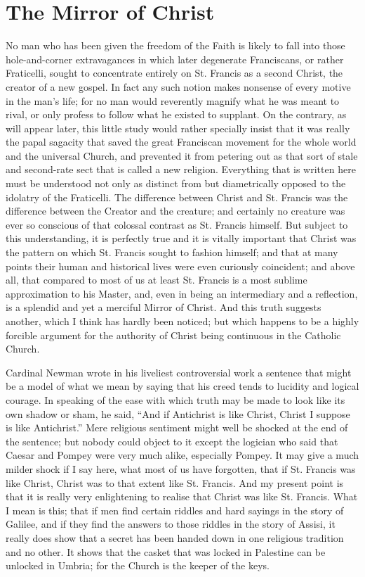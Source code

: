 \documentclass{book}
\begin{document}
\chapter{The Mirror of Christ}
\label{chapter-7}
No man who has been given the freedom of the Faith is likely to fall into those hole-and-corner extravagances in which later degenerate Franciscans, or rather Fraticelli, sought to concentrate entirely on St. Francis as a second Christ, the creator of a new gospel. In fact any such notion makes nonsense of every motive in the man’s life; for no man would reverently magnify what he was meant to rival, or only profess to follow what he existed to supplant. On the contrary, as will appear later, this little study would rather specially insist that it was really the papal sagacity that saved the great Franciscan movement for the whole world and the universal Church, and prevented it from petering out as that sort of stale and second-rate sect that is called a new religion. Everything that is written here must be understood not only as distinct from but diametrically opposed to the idolatry of the Fraticelli. The difference between Christ and St. Francis was the difference between the Creator and the creature; and certainly no creature was ever so conscious of that colossal contrast as St. Francis himself. But subject to this understanding, it is perfectly true and it is vitally important that Christ was the pattern on which St. Francis sought to fashion himself; and that at many points their human and historical lives were even curiously coincident; and above all, that compared to most of us at least St. Francis is a most sublime approximation to his Master, and, even in being an intermediary and a reflection, is a splendid and yet a merciful Mirror of Christ. And this truth suggests another, which I think has hardly been noticed; but which happens to be a highly forcible argument for the authority of Christ being continuous in the Catholic Church.

Cardinal Newman wrote in his liveliest controversial work a sentence that might be a model of what we mean by saying that his creed tends to lucidity and logical courage. In speaking of the ease with which truth may be made to look like its own shadow or sham, he said, “And if Antichrist is like Christ, Christ I suppose is like Antichrist.” Mere religious sentiment might well be shocked at the end of the sentence; but nobody could object to it except the logician who said that Caesar and Pompey were very much alike, especially Pompey. It may give a much milder shock if I say here, what most of us have forgotten, that if St. Francis was like Christ, Christ was to that extent like St. Francis. And my present point is that it is really very enlightening to realise that Christ was like St. Francis. What I mean is this; that if men find certain riddles and hard sayings in the story of Galilee, and if they find the answers to those riddles in the story of Assisi, it really does show that a secret has been handed down in one religious tradition and no other. It shows that the casket that was locked in Palestine can be unlocked in Umbria; for the Church is the keeper of the keys.
\end{document}
